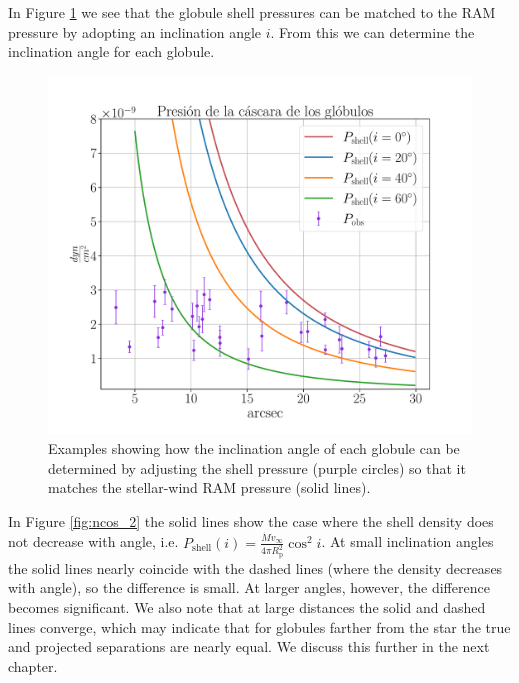 \documentclass{book}
\begin{document}
In Figure \ref{graf_presion_ang} we see that the globule shell
pressures can be matched to the RAM pressure by adopting an inclination
angle $i$. From this we can determine the inclination angle for each
globule.

\begin{figure}[htb]
    \centering
    \includegraphics[width=\textwidth]{imagenes_corregidas/S_52.pdf}
    \caption{Examples showing how the inclination angle of each globule
      can be determined by adjusting the shell pressure (purple circles)
      so that it matches the stellar-wind RAM pressure (solid lines).}
    \label{graf_presion_ang}
\end{figure}

In Figure \ref{fig:ncos_2} the solid lines show the case where the
shell density does not decrease with angle, i.e.
$P_\mathrm{shell}(i)=\frac{\dot{M}v_\infty}{4\pi R_\mathrm{p}^2}\cos^2i$.
At small inclination angles the solid lines nearly coincide with the
dashed lines (where the density decreases with angle), so the
difference is small. At larger angles, however, the difference becomes
significant. We also note that at large distances the solid and dashed
lines converge, which may indicate that for globules farther from the
star the true and projected separations are nearly equal. We discuss
this further in the next chapter.
\end{document}
